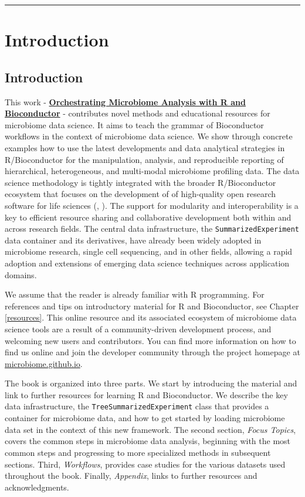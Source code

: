 \documentclass[
]{book}
\begin{document}
\begin{center}\rule{0.5\linewidth}{0.5pt}\end{center}

\hypertarget{part-introduction}{%
\part{Introduction}\label{part-introduction}}

\hypertarget{intro}{%
\chapter{Introduction}\label{intro}}

This work - \href{microbiome.github.io/OMA}{\textbf{Orchestrating Microbiome Analysis with R and
Bioconductor}} \citep{OMA} - contributes novel
methods and educational resources for microbiome data science. It
aims to teach the grammar of Bioconductor workflows in the context of
microbiome data science. We show through concrete examples how to use
the latest developments and data analytical strategies in
R/Bioconductor for the manipulation, analysis, and reproducible
reporting of hierarchical, heterogeneous, and multi-modal microbiome
profiling data. The data science methodology is tightly integrated
with the broader R/Bioconductor ecosystem that focuses on the
development of of high-quality open research software for life
sciences (\citet{Gentleman2004}, \citet{Huber2015}). The support for modularity and
interoperability is a key to efficient resource sharing and
collaborative development both within and across research fields. The
central data infrastructure, the \texttt{SummarizedExperiment} data container
and its derivatives, have already been widely adopted in microbiome
research, single cell sequencing, and in other fields, allowing a
rapid adoption and extensions of emerging data science techniques
across application domains.

We assume that the reader is already familiar with R programming. For
references and tips on introductory material for R and Bioconductor,
see Chapter \ref{resources}. This online resource and its associated
ecosystem of microbiome data science tools are a result of a
community-driven development process, and welcoming new users and
contributors. You can find more information on how to find us online
and join the developer community through the project homepage at
\href{https://microbiome.github.io}{microbiome.github.io}.

The book is organized into three parts. We start by introducing the
material and link to further resources for learning R and
Bioconductor. We describe the key data infrastructure, the
\texttt{TreeSummarizedExperiment} class that provides a container for
microbiome data, and how to get started by loading microbiome data set
in the context of this new framework. The second section, \emph{Focus
Topics}, covers the common steps in microbiome data analysis,
beginning with the most common steps and progressing to more
specialized methods in subsequent sections. Third, \emph{Workflows},
provides case studies for the various datasets used throughout the
book. Finally, \emph{Appendix}, links to further resources and
acknowledgments.
\end{document}
